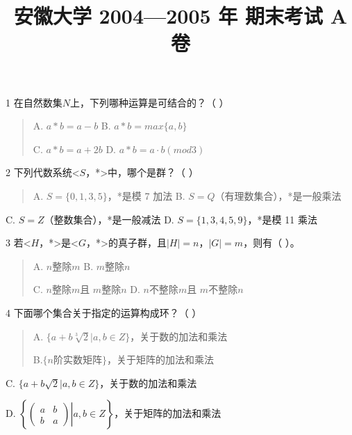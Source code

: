 \documentclass[fontset=exam]{exam-zh}
\title{安徽大学 2004—2005 年 期末考试 A 卷}
\begin{document}
\maketitle
{}
\noindent{}\par
{}

\par{}\smallskip

1 在自然数集\(N\)上，下列哪种运算是可结合的？（ ）

\begin{quote}
A. \(a*b = a - b\) B. \(a*b = max\{ a,b\}\)

C. \(a*b = a + 2b\) D. \(a*b = a \cdot b(mod3)\)
\end{quote}

2 下列代数系统\textless{}\(S\)，*\textgreater 中，哪个是群？（ ）

\begin{quote}
A. \(S = \{ 0,1,3,5\}\)，*是模 7 加法 B. \(S = Q\)（有理数集合），*是一般乘法
\end{quote}

C. \(S = Z\)（整数集合），*是一般减法 D. \(S = \{ 1,3,4,5,9\}\)，*是模 11 乘法

3 若\textless{}\(H\)，*\textgreater 是\textless{}\(G\)，*\textgreater 的真子群，且\(|H| = n\)，\(|G| = m\)，则有（ ）。

\begin{quote}
A. \(n\)整除\(m\) B. \(m\)整除\(n\)

C. \(n\)整除\(m\)且 \(m\)整除\(n\) D. \(n\)不整除\(m\)且 \(m\)不整除\(n\)
\end{quote}

4 下面哪个集合关于指定的运算构成环？（ ）

\begin{quote}
A. \(\{ a + b\sqrt[3]{2}|a,b \in Z\}\)，关于数的加法和乘法

B.\(\{ n\)阶实数矩阵\(\}\)，关于矩阵的加法和乘法
\end{quote}

C. \(\{ a + b\sqrt{2}|a,b \in Z\}\)，关于数的加法和乘法

D. \(\left\{ {\left. \begin{pmatrix}
a & b \\
b & a
\end{pmatrix} \right|a,b \in Z} \right\}\)，关于矩阵的加法和乘法
\end{document}
